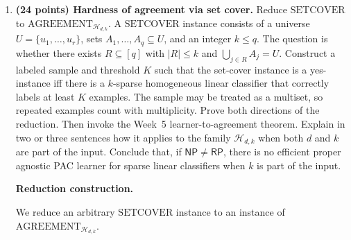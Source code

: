 \documentclass[11pt]{article}
\begin{document}
\begin{enumerate}
\begin{solutionbox}
        \textbf{Why this is not a contradiction.}

        This is a statistical/computational distinction. The VC-dimension result says that the
        class does not require too many samples to learn, assuming an ERM oracle is available.
        However, the brute-force algorithm shows that actually finding the empirical risk minimizer
        may require searching through exponentially many supports.

        So the statistical problem and the computational problem are different. Sparsity makes
        the class statistically simpler because there are fewer effective degrees of freedom, but
        it can make the optimization problem computationally difficult because the learner must
        identify which $k$ coordinates matter. Part~A.2 shows that this difficulty is not just a
        weakness of brute force; it is connected to NP-hardness.
    \end{solutionbox}

    \item \textbf{(24 points) Hardness of agreement via set cover.}
    \newline
    Reduce $\mathrm{SETCOVER}$ to $\mathrm{AGREEMENT}_{\mathcal{H}_{d,k}}$. A $\mathrm{SETCOVER}$ instance consists of a universe $U=\{u_1,\ldots,u_r\}$, sets $A_1,\ldots,A_q\subseteq U$, and an integer $k\le q$. The question is whether there exists $R\subseteq[q]$ with $|R|\le k$ and $\bigcup_{j\in R}A_j=U$.
    \newline
    Construct a labeled sample and threshold $K$ such that the set-cover instance is a yes-instance iff there is a $k$-sparse homogeneous linear classifier that correctly labels at least $K$ examples. The sample may be treated as a multiset, so repeated examples count with multiplicity.
    \newline
    Prove both directions of the reduction.
    \newline
    Then invoke the Week~5 learner-to-agreement theorem. Explain in two or three sentences how it applies to the family $\mathcal{H}_{d,k}$ when both $d$ and $k$ are part of the input. Conclude that, if $\mathsf{NP}\ne\mathsf{RP}$, there is no efficient proper agnostic PAC learner for sparse linear classifiers when $k$ is part of the input.

    \begin{solutionbox}
        \textbf{Reduction construction.}

        We reduce an arbitrary $\mathrm{SETCOVER}$ instance to an instance of
        $\mathrm{AGREEMENT}_{\mathcal{H}_{d,k}}$.


\end{solutionbox}
\end{enumerate}
\end{document}
